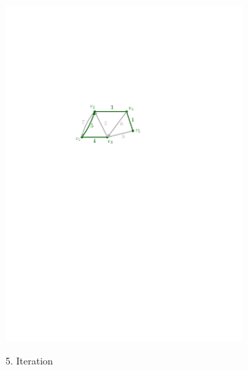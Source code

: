 \documentclass[12pt,a4paper]{article}
\begin{document}
\begin{figure}[h]
\begin{subfigure}{0.32\textwidth}
\includegraphics[width = \textwidth]{../media/dijkstra5.pdf} \\
\caption{5. Iteration}
\vspace{0.5cm}
\label{fig:dijkstra5}
\end{subfigure}
\begin{subfigure}{1\textwidth}
\label{tab:dijkstraLists}
\begin{tabular}{r|l|l}


\end{tabular}
\end{subfigure}
\end{figure}
\end{document}
